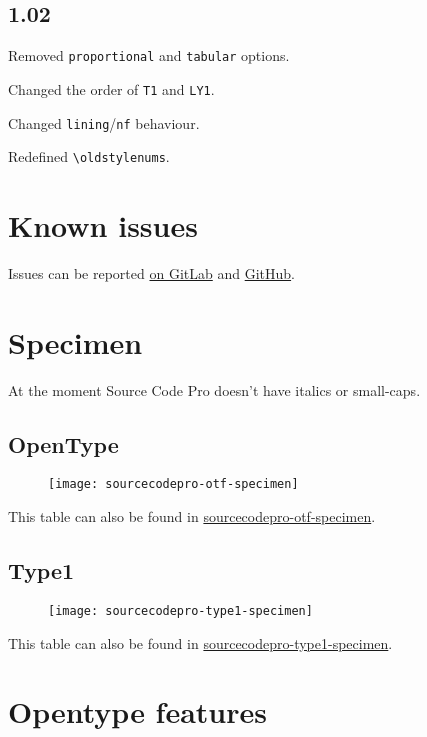 \documentclass[10pt,a4paper,english]{article}
\newcommand*\file[1]{\href{run:#1.pdf}{#1}}
\begin{document}
\begin{multicols}{2}
\subsection*{1.02}
\begin{itemize*}
	\item Removed \texttt{proportional} and \texttt{tabular} options.
	\item Changed the order of \texttt{T1} and \texttt{LY1}.
	\item Changed \texttt{lining}/\texttt{nf} behaviour.
	\item Redefined \texttt{\textbackslash oldstylenums}.
\end{itemize*}

\section{Known issues}

Issues can be reported \href{https://gitlab.com/slxh/latex/sourcecodepro/issues}{on GitLab} and \href{https://github.com/silkeh/latex-sourcecodepro/issues}{GitHub}.

\newpage
\end{multicols}

\section{Specimen}
At the moment Source Code Pro doesn’t have italics or small-caps.
\label{sec:specimen}
\subsection{OpenType}
\begin{figure}[ht]
	\centering
	\texttt{[image: sourcecodepro-otf-specimen]}
\end{figure}
This table can also be found in \file{sourcecodepro-otf-specimen}.

\subsection{Type1}
\begin{figure}[ht]
	\centering
	\texttt{[image: sourcecodepro-type1-specimen]}
\end{figure}
This table can also be found in \file{sourcecodepro-type1-specimen}.

\newpage
\section{Opentype features}
\label{sec:otfinfo}
\end{document}
